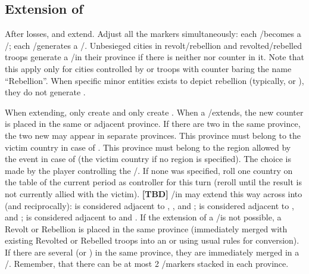 \subsection{Extension of \REVOLT}
\label{chRedep:Extension Revolts}
 After \STAB losses, \REVOLT and \REBELLION extend. Adjust
all the markers simultaneously:
\bparag each \REVOLT/\REBELLION\facemoins becomes a
\REVOLT/\REBELLION\faceplus;
\bparag each \REVOLT/\REBELLION\faceplus generates a
\REVOLT/\REBELLION\facemoins.
\bparag Unbesieged cities in revolt/rebellion and revolted/rebelled troops
generate a \REVOLT/\REBELLION\facemoins in their province if there is neither
\REVOLT nor \REBELLION counter in it.
\bparag Note that this apply only for cities controlled by or troops with
counter baring the name ``Rebellion''. When specific minor entities exists to
depict rebellion (typically,  or ), they do
not generate \REBELLION.

\bparag When extending, \REVOLT only create \REVOLT and \REBELLION only create
\REBELLION.
\bparag When a \REVOLT/\REBELLION\Faceplus extends, the new counter is placed 
in the same or adjacent province. If there are two \REVOLT\Faceplus in the
same province, the two new \REVOLT\Facemoins may appear in separate
provinces.
\bparag This province must belong to the victim country in case of \REVOLT.
\bparag This province must belong to the region allowed by the event in case
of \REBELLION (the victim country if no region is specified).
\bparag The choice is made by the player controlling the
\REVOLT/\REBELLION. If none was specified, roll one country on the \REVOLT
table of the current period as controller for this turn (reroll until the
result is not currently allied with the victim).
\bparag \textbf{[TBD]} \REVOLT/\REBELLION in \regionIrlande may extend this
way across \seazoneMan into \ANG (and reciprocally): \provinceUlster is
considered adjacent to \provinceAlba, \provinceAyr, \provinceGalloway and
\provinceCumberland ; \provinceBrega is considered adjacent to
\provinceCumberland, \provinceLancashire and \provinceCymru ;
\provinceLeinster is considered adjacent to \provinceCymru and
\provinceCornwall.
\bparag If the extension of a \REVOLT/\REBELLION\faceplus is not possible, a
Revolt or Rebellion \LD is placed in the same province (immediately merged
with existing Revolted or Rebelled troops into an \ARMY\Facemoins or
\ARMY\Faceplus using usual rules for conversion).
\bparag If there are several \REVOLT\Facemoins (or \REBELLION\Facemoins) in
the same province, they are immediately merged in a
\REVOLT/\REBELLION\Faceplus.
\bparag Remember, that there can be at most 2 \REVOLT/\REBELLION markers
stacked in each province.

